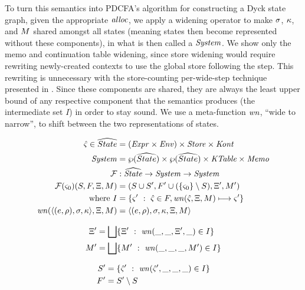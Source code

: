 To turn this semantics into PDCFA's algorithm for constructing a Dyck state graph, given the appropriate $\mathit{alloc}$, we apply a widening operator to make $\sigma$, $\kappa$, and $M$ shared amongst all states (meaning states then become represented without these components), in what is then called a $\mathit{System}$.
%
We show only the memo and continuation table widening, since store widening would require rewriting newly-created contexts to use the global store following the step.
%
This rewriting is unnecessary with the store-counting per-wide-step technique presented in \citet{ianjohnson:oaam:icfp2013}.
%
Since these components are shared, they are always the least upper bound of any respective component that the semantics produces (the intermediate set $I$) in order to stay sound.
%
We use a meta-function $\mathit{wn}$, ``wide to narrow'', to shift between the two representations of states.

{
\setlength{\abovedisplayskip}{0pt}
\setlength{\belowdisplayskip}{4pt}
\setlength{\abovedisplayshortskip}{0pt}
\setlength{\belowdisplayshortskip}{8pt}
\begin{align*}
  \hat\varsigma \in \widehat{State} &= (\mathit{Expr} \times \mathit{Env}) \times \mathit{Store} \times \mathit{Kont} \\
  \mathit{System} &= \wp(\widehat{State}) \times \wp(\widehat{State}) \times \mathit{KTable} \times \mathit{Memo} \\
  {\mathcal F} &: \widehat{\mathit{State}} \to \mathit{System} \to \mathit{System} \\
  {\mathcal F}(\varsigma_0)(S, F, \Xi, M) &= (S \cup S', F' \cup (\{ \varsigma_0 \} \setminus S), \Xi', M') \\
  \text{where } I &= \{ \varsigma'\ :\ \hat\varsigma \in F, \mathit{wn}(\hat\varsigma,\Xi,M) \longmapsto \varsigma'\} \\
                \mathit{wn}(\langle (e,\rho),\sigma,\kappa \rangle,\Xi,M)
                   &= \langle (e,\rho),\sigma,\kappa,\Xi,M \rangle
\end{align*}
\begin{minipage}{.55\linewidth}
  \begin{align*}
    \Xi' &=  \bigsqcup\{ \Xi'\ :\ \mathit{wn}(\_, \_, \Xi', \_) \in I\} \\
    M' &= \bigsqcup\{ M'\ :\ \mathit{wn}(\_, \_, \_, M') \in I\}
  \end{align*}
\end{minipage}
\begin{minipage}{.40\linewidth}
  \begin{align*}
    S' &= \{ \hat\varsigma'\ :\ \mathit{wn}(\hat\varsigma', \_, \_, \_) \in I\} \\
    F' &= S' \setminus S
  \end{align*}
\end{minipage}
}

